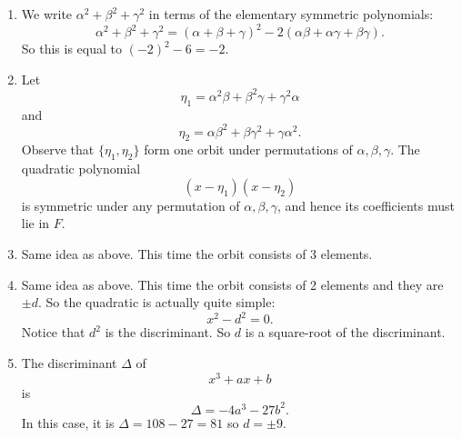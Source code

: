 \documentclass[12pt]{amsart}
\begin{document}
\begin{enumerate}
\item We write \(\alpha^2+\beta^2+\gamma^2\) in terms of the elementary symmetric polynomials:
\[ \alpha^2+\beta^2+\gamma^2 = (\alpha+\beta+\gamma)^2-2(\alpha\beta+\alpha\gamma+\beta\gamma).\]
So this is equal to \((-2)^2-6 = -2.\)

\item Let
\[ \eta_1 = \alpha^2 \beta + \beta^2 \gamma + \gamma^2\alpha\]
and
\[ \eta_2 = \alpha \beta^2 + \beta \gamma^2 + \gamma\alpha^{2}.\]
Observe that \(\{\eta_1,\eta_2\}\) form one orbit under permutations of \(\alpha,\beta,\gamma\).
The quadratic polynomial
\[(x-\eta_1)(x-\eta_2)\]
is symmetric under any permutation of \(\alpha,\beta,\gamma\), and hence its coefficients must lie in \(F\).

\item Same idea as above.
This time the orbit consists of 3 elements.

\item Same idea as above.
This time the orbit consists of 2 elements and they are \(\pm d\).
So the quadratic is actually quite simple: \[x^2-d^2 = 0.\]
Notice that \(d^2\) is the discriminant.
So \(d\) is a square-root of the discriminant.

\item The discriminant \(\Delta\) of
\[ x^3+ax+b\]
is
\[ \Delta = -4a^3-27b^2.\]
In this case, it is \(\Delta = 108-27 = 81\) so \(d = \pm 9\).
\end{enumerate}
\end{document}
